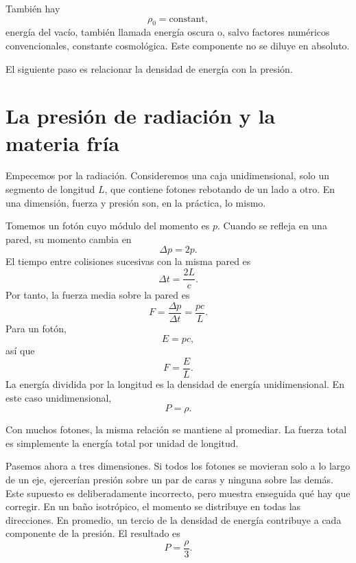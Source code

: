 También hay
\begin{equation}
\rho_0=\text{constant},
\end{equation}
energía del vacío, también llamada energía oscura o, salvo factores numéricos convencionales, constante cosmológica. Este componente no se diluye en absoluto.

El siguiente paso es relacionar la densidad de energía con la presión.

\section{La presión de radiación y la materia fría}

Empecemos por la radiación. Consideremos una caja unidimensional, solo un segmento de longitud \(L\), que contiene fotones rebotando de un lado a otro. En una dimensión, fuerza y presión son, en la práctica, lo mismo.

Tomemos un fotón cuyo módulo del momento es \(p\). Cuando se refleja en una pared, su momento cambia en
\begin{equation}
\Delta p = 2p.
\end{equation}
El tiempo entre colisiones sucesivas con la misma pared es
\begin{equation}
\Delta t = \frac{2L}{c}.
\end{equation}
Por tanto, la fuerza media sobre la pared es
\begin{equation}
F=\frac{\Delta p}{\Delta t}=\frac{pc}{L}.
\end{equation}
Para un fotón,
\begin{equation}
E=pc,
\end{equation}
así que
\begin{equation}
F=\frac{E}{L}.
\end{equation}
La energía dividida por la longitud es la densidad de energía unidimensional. En este caso unidimensional,
\begin{equation}
P=\rho .
\end{equation}

Con muchos fotones, la misma relación se mantiene al promediar. La fuerza total es simplemente la energía total por unidad de longitud.

Pasemos ahora a tres dimensiones. Si todos los fotones se movieran solo a lo largo de un eje, ejercerían presión sobre un par de caras y ninguna sobre las demás. Este supuesto es deliberadamente incorrecto, pero muestra enseguida qué hay que corregir. En un baño isotrópico, el momento se distribuye en todas las direcciones. En promedio, un tercio de la densidad de energía contribuye a cada componente de la presión. El resultado es
\begin{equation}
P=\frac{\rho}{3}.
\end{equation}

